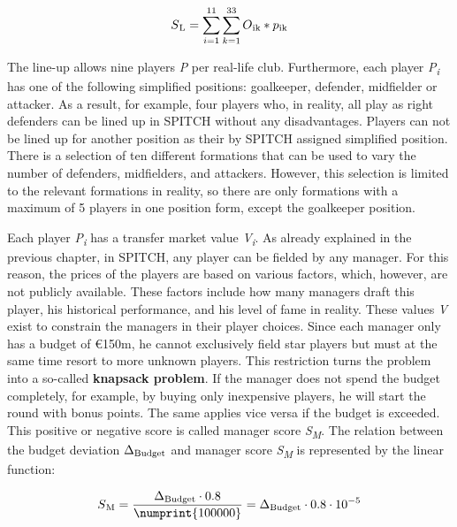 \begin{equation}
    S\textsubscript{L} = \sum_{i=1}^{11} \sum_{k=1}^{33} O\textsubscript{ik} * p\textsubscript{ik}
    \label{eq:final_score_without_ms}
\end{equation}

The line-up allows nine players \emph{P} per real-life club. \parencite[cf.][]{spitch_rules_2021} Furthermore, each player \emph{P\textsubscript{i}} has one of the following simplified positions: goalkeeper, defender, midfielder or attacker. As a result, for example, four players who, in reality, all play as right defenders can be lined up in SPITCH without any disadvantages. Players can not be lined up for another position as their by SPITCH assigned simplified position. There is a selection of ten different formations that can be used to vary the number of defenders, midfielders, and attackers. However, this selection is limited to the relevant formations in reality, so there are only formations with a maximum of 5 players in one position form, except the goalkeeper position.

Each player \emph{P\textsubscript{i}} has a transfer market value \emph{V\textsubscript{i}}. As already explained in the previous chapter, in SPITCH, any player can be fielded by any manager. For this reason, the prices of the players are based on various factors, which, however, are not publicly available. These factors include how many managers draft this player, his historical performance, and his level of fame in reality. These values \emph{V} exist to constrain the managers in their player choices. Since each manager only has a budget of €150m, he cannot exclusively field star players but must at the same time resort to more unknown players. This restriction turns the problem into a so-called \textbf{knapsack problem}. If the manager does not spend the budget completely, for example, by buying only inexpensive players, he will start the round with bonus points. The same applies vice versa if the budget is exceeded. This positive or negative score is called manager score \emph{S\textsubscript{M}}. The relation between the budget deviation \emph{$ \Delta \textsubscript{Budget} $} and manager score \emph{S\textsubscript{M}} is represented by the linear function:

\begin{equation}
    S\textsubscript{M} = \frac{\Delta \textsubscript{Budget}\cdot0.8}{\numprint{100000}} = \Delta \textsubscript{Budget}\cdot0.8\cdot10^{-5}
    \label{eq:value_to_manager_score}
\end{equation}

